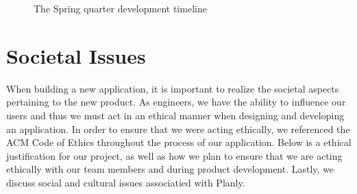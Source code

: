 \begin{figure}[h]
\centering
  \begin{gantt}{17}{10}
    \begin{ganttitle}
    \end{ganttitle}
    \begin{ganttitle}
    \end{ganttitle}

    \end{gantt}
    \caption{The Spring quarter development timeline}
\end{figure}
\FloatBarrier

\section{Societal Issues}
When building a new application, it is important to realize the societal aspects pertaining to the new product. As engineers, we have the ability to influence our users and thus we must act in an ethical manner when designing and developing an application. In order to ensure that we were acting ethically, we referenced the ACM Code of Ethics throughout the process of our application. Below is a ethical justification for our project, as well as how we plan to ensure that we are acting ethically with our team members and during product development. Lastly, we discuss social and cultural issues associatied with Planly. 
